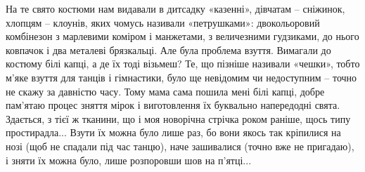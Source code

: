 На те свято костюми нам видавали в дитсадку «казенні», дівчатам – сніжинок,
хлопцям – клоунів, яких чомусь називали «петрушками»: двокольоровий комбінезон
з марлевими коміром і манжетами, з величезними гудзиками, до нього ковпачок і
два металеві брязкальці. Але була проблема взуття. Вимагали до костюму білі
капці, а де їх тоді візьмеш? Те, що пізніше називали «чешки», тобто м’яке
взуття для танців і гімнастики, було ще невідомим чи недоступним – точно не
скажу за давністю часу. Тому мама сама пошила мені білі капці, добре пам’ятаю
процес зняття мірок і виготовлення їх буквально напередодні свята. Здається, з
тієї ж тканини, що і моя новорічна стрічка роком раніше, щось типу простирадла...
Взути їх можна було лише раз, бо вони якось так кріпилися на нозі (щоб не
спадали під час танцю), наче зашивалися (точно вже не пригадаю), і зняти їх
можна було, лише розпоровши шов на п’ятці...

